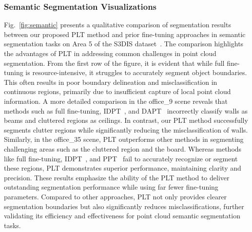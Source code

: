 \subsubsection{Semantic Segmentation Visualizations}  
Fig.~\ref{fig:semantic} presents a qualitative comparison of segmentation results between our proposed PLT method and prior fine-tuning approaches in semantic segmentation tasks on Area 5 of the S3DIS dataset~\cite{armeni20163d}. The comparison highlights the advantages of PLT in addressing common challenges in point cloud segmentation. From the first row of the figure, it is evident that while full fine-tuning is resource-intensive, it struggles to accurately segment object boundaries. This often results in poor boundary delineation and misclassification in continuous regions, primarily due to insufficient capture of local point cloud information. A more detailed comparison in the office\_9 scene reveals that methods such as full fine-tuning, IDPT~\cite{zha2023instance}, and DAPT~\cite{zhou2024dynamic} incorrectly classify walls as beams and cluttered regions as ceilings. In contrast, our PLT method successfully segments clutter regions while significantly reducing the misclassification of walls. Similarly, in the office\_35 scene, PLT outperforms other methods in segmenting challenging areas such as the cluttered region and the board. Whereas methods like full fine-tuning, IDPT~\cite{zha2023instance}, and PPT~\cite{zhang2024positional} fail to accurately recognize or segment these regions, PLT demonstrates superior performance, maintaining clarity and precision. These results emphasize the ability of the PLT method to deliver outstanding segmentation performance while using far fewer fine-tuning parameters. Compared to other approaches, PLT not only provides clearer segmentation boundaries but also significantly reduces misclassifications, further validating its efficiency and effectiveness for point cloud semantic segmentation tasks.












